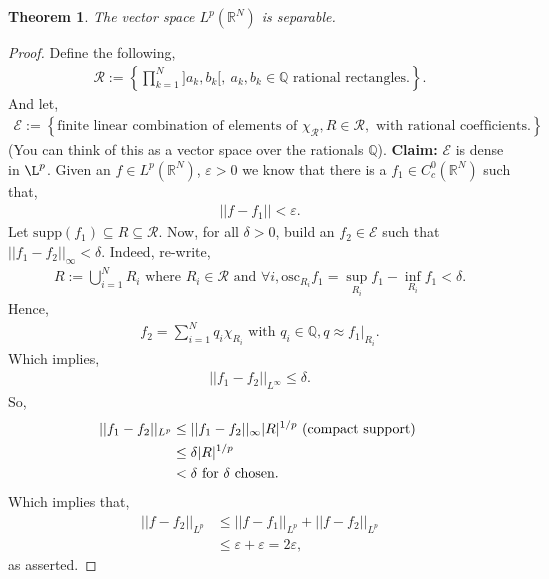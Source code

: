 \documentclass[psamsfonts]{amsart}
\newtheorem{thm}{Theorem}[section]
\theoremstyle{definition}
\theoremstyle{remark}
\newcommand{\R}[0]{\mathbb{R}}
\newcommand{\eps}[0]{\varepsilon}
\numberwithin{equation}{section}
\begin{document}
\begin{thm}
The vector space \(L^p(\R^N) \) is separable. 	
\end{thm}
\begin{proof}
	Define the following, 
	\begin{align*}
		\mathcal{R} := \left\{ \prod_{k=1}^N ]a_k, b_k[,\ a_k, b_k \in \mathbb{Q} \text{ rational rectangles.}  \right\}. 
	\end{align*}
	And let, 
	\begin{align*}
		\mathcal{E} := \left\{ \text{finite linear combination of elements of } \chi_\mathcal{R}, R \in \mathcal{R}, \text{ with rational coefficients.}  \right\} 
	\end{align*}
	(You can think of this as a vector space over the rationals \( \mathbb{Q} \)). \textbf{Claim:} \( \mathcal{E} \) is dense in \( \L^p \). Given an \( f \in L^p(\R^N) \), \( \eps > 0 \) we know that there is a \( f_1 \in C_c^0(\R^N) \) such that, 
	\begin{align*}
		|| f - f_1 || < \eps.
	\end{align*}
	Let \( \text{supp}(f_1) \subseteq R \subseteq \mathcal{R} \). Now, for all \( \delta > 0 \), build an \( f_2 \in \mathcal{E} \) such that \( || f_1 - f_2 ||_\infty < \delta \). Indeed, re-write, 
	\begin{align*}
		R := \bigcup_{i=1}^N R_i \text{ where } R_i \in \mathcal{R} \text{ and } \forall i, \text{osc}_{R_i} f_1 = \sup_{R_i} f_1 - \inf_{R_i} f_1 < \delta.
	\end{align*}
	Hence, 
	\begin{align*}
		f_2 = \sum_{i=1}^N q_i \chi_{R_i} \text{ with } q_i \in \mathbb{Q}, q \approx f_1|_{R_i}.
	\end{align*}
	Which implies, 
	\begin{align*}
		||f_1 - f_2||_{L^\infty} \leq \delta.
	\end{align*}
	So, 
	\begin{align*}
		||f_1 - f_2||_{L^p} & \leq ||f_1 - f_2||_\infty |R|^{1/p} \text{ (compact support) } \\
		& \leq \delta |R|^{1/p} \\
	 & < \delta \text{ for \( \delta \) chosen. }
	\end{align*}
	Which implies that, 
	\begin{align*}
		||f - f_2 ||_{L^p} & \leq ||f-f_1||_{L^p} + ||f-f_2||_{L^p} \\
						 & \leq \eps + \eps = 2 \eps,
	\end{align*}
	as asserted.
\end{proof}
\end{document}
